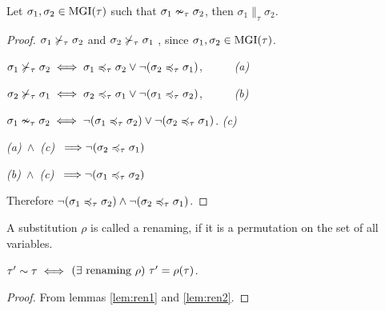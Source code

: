 \documentclass[a4paper,oneside]{memoir}
\begin{document}
\begin{lemma}
Let $\sigma_1, \sigma_2 \in \operatorname{MGI}(\tau)$ such that $\sigma_1 \nsim_\tau \sigma_2$,
then $\sigma_1 \parallel_\tau \sigma_2$.  
\end{lemma}
\begin{proof}
$\sigma_1 \nsucc_\tau \sigma_2$ and $\sigma_2 \nsucc_\tau \sigma_1$ , 
since $\sigma_1, \sigma_2 \in \operatorname{MGI}(\tau)$.

$\sigma_1 \nsucc_\tau \sigma_2 \iff \sigma_1 \preccurlyeq_\tau \sigma_2 \vee \neg(\sigma_2 \preccurlyeq_\tau \sigma_1)$,~~~~~ \textit{(a)}

$\sigma_2 \nsucc_\tau \sigma_1 \iff \sigma_2 \preccurlyeq_\tau \sigma_1 \vee \neg(\sigma_1 \preccurlyeq_\tau \sigma_2)$,~~~~~ \textit{(b)}

$\sigma_1 \nsim_\tau \sigma_2 \iff \neg(\sigma_1 \preccurlyeq_\tau \sigma_2) \vee \neg(\sigma_2 \preccurlyeq_\tau \sigma_1)$. \textit{(c)}

\textit{(a)~$\wedge$~(c)~} $\Longrightarrow \neg(\sigma_2 \preccurlyeq_\tau \sigma_1)$

\textit{(b)~$\wedge$~(c)~} $\Longrightarrow \neg(\sigma_1 \preccurlyeq_\tau \sigma_2)$

Therefore $\neg(\sigma_1 \preccurlyeq_\tau \sigma_2) \wedge \neg(\sigma_2 \preccurlyeq_\tau \sigma_1)$.
\end{proof}




\begin{definition}
A substitution $\rho$ is called a renaming, if it is a permutation on the set of all variables.
\end{definition}

\begin{lemma}
$\tau^\prime \sim \tau \iff$ $(\exists \text{ renaming } \rho)\ \tau^\prime = \rho(\tau)$.
\end{lemma}
\begin{proof}
From lemmas \ref{lem:ren1} and \ref{lem:ren2}.
\end{proof}


\end{document}
